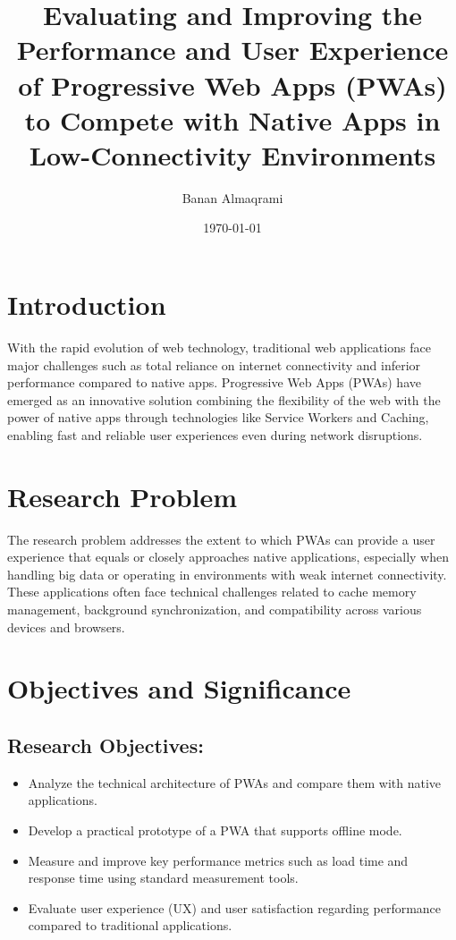 \documentclass[12pt, a4paper]{article}
\title{\textbf{Evaluating and Improving the Performance and User Experience of Progressive Web Apps (PWAs) to Compete with Native Apps in Low-Connectivity Environments}}
\author{Banan Almaqrami}
\date{\today}
\begin{document}
\maketitle

\section{Introduction}
With the rapid evolution of web technology, traditional web applications face major challenges such as total reliance on internet connectivity and inferior performance compared to native apps. Progressive Web Apps (PWAs) have emerged as an innovative solution combining the flexibility of the web with the power of native apps through technologies like Service Workers and Caching, enabling fast and reliable user experiences even during network disruptions.

\section{Research Problem}
The research problem addresses the extent to which PWAs can provide a user experience that equals or closely approaches native applications, especially when handling big data or operating in environments with weak internet connectivity. These applications often face technical challenges related to cache memory management, background synchronization, and compatibility across various devices and browsers.

\section{Objectives and Significance}
\subsection{Research Objectives:}
\begin{itemize}
    \item Analyze the technical architecture of PWAs and compare them with native applications.
    \item Develop a practical prototype of a PWA that supports offline mode.
    \item Measure and improve key performance metrics such as load time and response time using standard measurement tools.
    \item Evaluate user experience (UX) and user satisfaction regarding performance compared to traditional applications.
\end{itemize}
\end{document}
